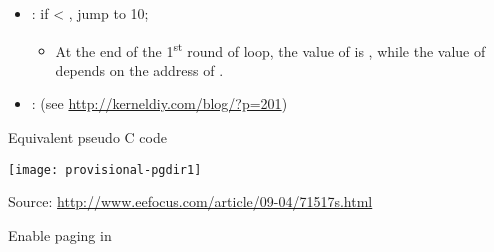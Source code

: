 \begin{itemize}
\begin{enumerate}
  \item {}
  \end{enumerate}
\item {}: if  < , jump to 10;
  \begin{itemize}
  \item At the end of the 1\textsuperscript{st} round of loop, the value of  is
    , while the value of  depends on the address of .
  \end{itemize}
\item {}:  (see \url{http://kerneldiy.com/blog/?p=201})
\end{itemize}

\begin{frame}
  \begin{block}{Equivalent pseudo C code}
    \begin{center}
      \texttt{[image: provisional-pgdir1]}
    \end{center}
  \end{block}
\end{frame}

Source: \url{http://www.eefocus.com/article/09-04/71517s.html}

\begin{frame}{Enable paging}
   in 
  \begin{center}
  \end{center}
\end{frame}

